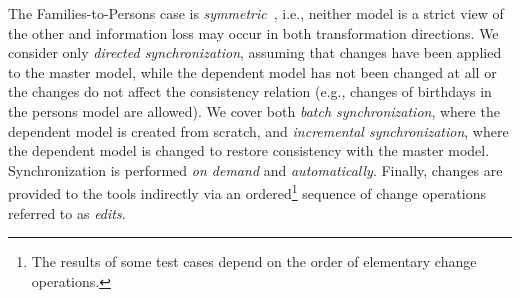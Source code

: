 The Families-to-Persons case is \emph{symmetric}~\cite{Diskin2014}, i.e., neither model is a strict view of the other and information loss may occur in both transformation directions. We consider only \emph{directed synchronization}, assuming that changes have been applied to the master model, while the dependent model has not been changed at all or the changes do not affect the consistency relation (e.g., changes of birthdays in the persons model are allowed). We cover both \emph{batch synchronization}, where the dependent model is created from scratch, and \emph{incremental synchronization}, where the dependent model is changed to restore consistency with the master model. Synchronization is performed  \emph{on demand} and \emph{automatically}.
Finally, changes are provided to the tools indirectly via an ordered\footnote{The results of some test cases depend on the order of elementary change operations.} sequence of change operations referred to as \emph{edits}.
%
%
%
%	
%	
%		
%	
